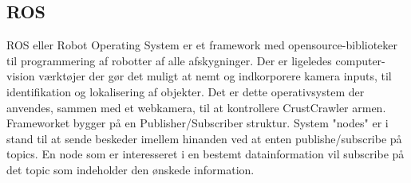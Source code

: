 \subsection{ROS}
ROS eller Robot Operating System er et framework med opensource-biblioteker til programmering af robotter af alle afskygninger. Der er ligeledes computer-vision værktøjer der gør det muligt at nemt og indkorporere kamera inputs, til identifikation og lokalisering af objekter. Det er dette operativsystem der anvendes, sammen med et webkamera, til at kontrollere CrustCrawler armen. 
\newline
Frameworket bygger på en Publisher/Subscriber struktur. System "nodes" er i stand til at sende beskeder imellem hinanden ved at enten publishe/subscribe på topics. En node som er interesseret i en bestemt datainformation vil subscribe på det topic som indeholder den ønskede information.